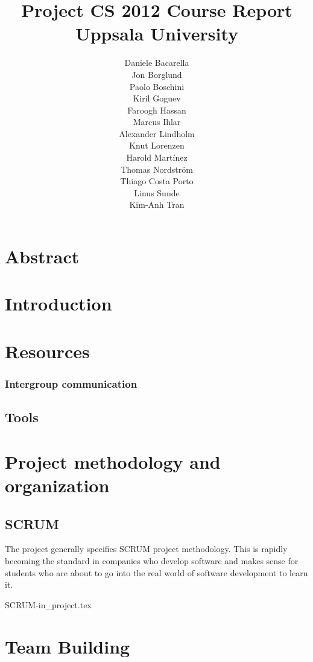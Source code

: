 \documentclass[11pt]{report}
\title{Project CS 2012 Course Report\\Uppsala University\\}
\author{Daniele Bacarella\\
		Jon Borglund\\
		Paolo Boschini\\
		Kiril Goguev\\
		Faroogh Hassan\\
		Marcus Ihlar\\
		Alexander Lindholm\\
		Knut Lorenzen\\
		Harold Mart\'{i}nez\\
		Thomas Nordstr\"om\\
		Thiago Costa Porto\\
		Linus Sunde\\
		Kim-Anh Tran
}
\date{}
\begin{document}
\maketitle

\tableofcontents

\chapter{Abstract}


\chapter{Introduction}

\chapter{Resources}




\subsection{Intergroup communication}

\section{Tools}



\chapter{Project methodology and organization}
\section{SCRUM}

The project generally specifies SCRUM project methodology. This is rapidly becoming the standard in companies who develop software and makes sense for students who are about to go into the real world of software development to learn it.





 {SCRUM-in_project.tex}


\chapter{Team Building}

\end{document}
